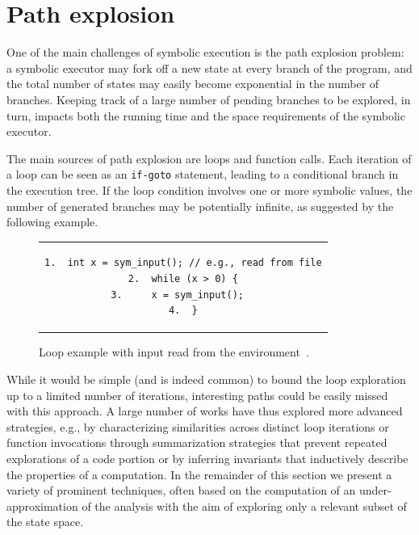 
\section{Path explosion}
\label{se:path-explosion}

One of the main challenges of symbolic execution is the path explosion problem: a symbolic executor may fork off a new state at every branch of the program, and the total number of states may easily become exponential in the number of branches. Keeping track of a large number of pending branches to be explored, in turn, impacts both the running time and the space requirements of the symbolic executor. 

The main sources of path explosion are loops and function calls. Each iteration of a loop can be seen as an {\tt if-goto} statement, leading to a conditional branch in the execution tree. If the loop condition involves one or more symbolic values, the number of generated branches may be potentially infinite, as suggested by the following example. 

\begin{figure}[t]
\begin{center}
\begin{tabular}{c}
\begin{lstlisting}[basicstyle=\ttfamily\scriptsize]
1.  int x = sym_input(); // e.g., read from file
2.  while (x > 0) {
3.     x = sym_input();  
4.  }
\end{lstlisting}
\end{tabular}
\end{center}
\vspace{-2mm}
\caption{Loop example with input read from the environment~\protect\cite{CS-CACM13}.}
\label{fi:example-loop}
\end{figure}

\vspace{-2pt} %

While it would be simple (and is indeed common) to bound the loop exploration up to a limited number of iterations, interesting paths could be easily missed with this approach.  A large number of works have thus explored more advanced strategies, e.g., by characterizing similarities across distinct loop iterations or function invocations through summarization strategies that prevent repeated explorations of a code portion or by inferring invariants that inductively describe the properties of a computation. In the remainder of this section we present a variety of prominent techniques, often based on the computation of an under-approximation of the analysis with the aim of exploring only a relevant subset of the state space.

